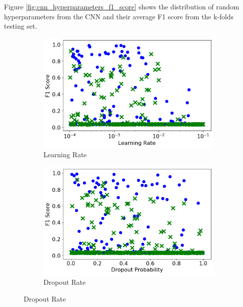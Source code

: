 Figure \ref{fig:cnn_hyperparameters_f1_score} shows the distribution of random hyperparameters from the CNN and their average F1 score from the k-folds testing set. 

\begin{figure}[H]
     \centering
     \begin{subfigure}[b]{0.49\textwidth}
         \centering
         \includegraphics[width=\textwidth]{images/cnn_learning_rate.png}
         \caption{Learning Rate}
         \label{fig:cnn_learning_rate}
     \end{subfigure}
     \hfill
     \begin{subfigure}[b]{0.49\textwidth}
         \centering
         \includegraphics[width=\textwidth]{images/cnn_dropout.png}
         \caption{Dropout Rate}
         \label{fig:cnn_dropout}
     \end{subfigure}


\end{figure}
